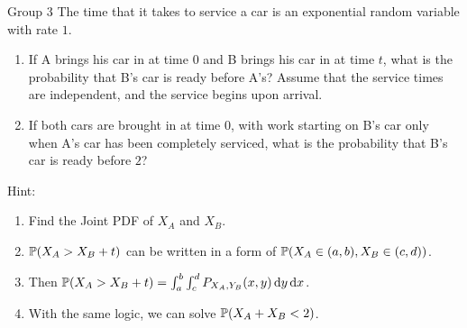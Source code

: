 \documentclass{article}
\begin{document}
\begin{problem}
    {Group 3}
    The time that it takes to service a car is an exponential random variable with rate $1$.
    \begin{enumerate}
        \item If A brings his car in at time $0$ and B brings his car in at time $t$, what is the probability that B's car is ready before A's? Assume that the service times are independent, and the service begins upon arrival.
        \item If both cars are brought in at time $0$, with work starting on B's car only when A's car has been completely serviced, what is the probability that B's car is ready before $2$?
    \end{enumerate}
    \begin{solution}
        {Hint:}
        \begin{enumerate}
            \item Find the Joint PDF of $X_A$ and $X_B$.
            \item $\P{X_A>X_B+t}$ can be written in a form of $\P{X_A\in(a,b), X_B\in(c,d)}$.
            \item Then $\P{X_A>X_B+t}=\int_{a}^{b}\int_{c}^{d}P_{X_A,Y_B}(x,y)\diff y \diff x$.
            \item With the same logic, we can solve $\P{X_A+X_B<2}$.
        \end{enumerate}
    \end{solution}
\end{problem}
\end{document}
